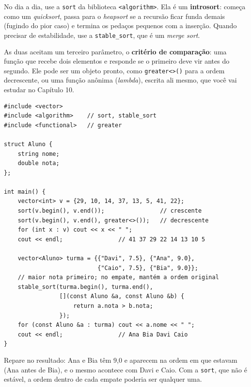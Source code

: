 No dia a dia, use a \texttt{sort} da biblioteca \texttt{<algorithm>}. Ela é um \textbf{introsort}: começa como um \textit{quicksort}, passa para o \textit{heapsort} se a recursão ficar funda demais (fugindo do pior caso) e termina os pedaços pequenos com a inserção. Quando precisar de estabilidade, use a \texttt{stable\_sort}, que é um \textit{merge sort}.

As duas aceitam um terceiro parâmetro, o \textbf{critério de comparação}: uma função que recebe dois elementos e responde se o primeiro deve vir antes do segundo. Ele pode ser um objeto pronto, como \texttt{greater<>()} para a ordem decrescente, ou uma função anônima (\textit{lambda}), escrita ali mesmo, que você vai estudar no Capítulo 10.

\begin{codigo}
\begin{Verbatim}[breaklines=true, breaksymbolleft={}, fontsize=\footnotesize]
#include <vector>
#include <algorithm>    // sort, stable_sort
#include <functional>   // greater

struct Aluno {
    string nome;
    double nota;
};

int main() {
    vector<int> v = {29, 10, 14, 37, 13, 5, 41, 22};
    sort(v.begin(), v.end());                // crescente
    sort(v.begin(), v.end(), greater<>());   // decrescente
    for (int x : v) cout << x << " ";
    cout << endl;                // 41 37 29 22 14 13 10 5

    vector<Aluno> turma = {{"Davi", 7.5}, {"Ana", 9.0},
                           {"Caio", 7.5}, {"Bia", 9.0}};
    // maior nota primeiro; no empate, mantém a ordem original
    stable_sort(turma.begin(), turma.end(),
                [](const Aluno &a, const Aluno &b) {
                    return a.nota > b.nota;
                });
    for (const Aluno &a : turma) cout << a.nome << " ";
    cout << endl;                // Ana Bia Davi Caio
}
\end{Verbatim}
\end{codigo}

Repare no resultado: Ana e Bia têm 9,0 e aparecem na ordem em que estavam (Ana antes de Bia), e o mesmo acontece com Davi e Caio. Com a \texttt{sort}, que não é estável, a ordem dentro de cada empate poderia ser qualquer uma.

